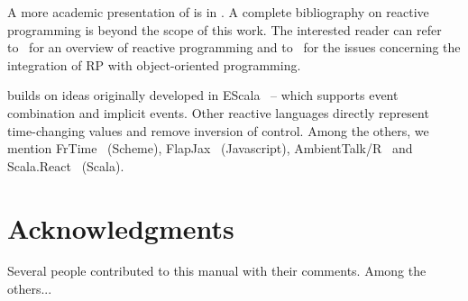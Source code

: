 \documentclass[10pt,a4paper]{article}
\newcommand{\REScala}{{\small \sc{REScala}}\xspace}
\begin{document}
A more academic presentation of \REScala is in \cite{rescala}. A
complete bibliography on reactive programming is beyond the scope of
this work. The interested reader can refer
to~\cite{rective-progr-survey} for an overview of reactive programming
and to~\cite{Salvaneschi:2013:RBO:2451436.2451442} for the issues
concerning the integration of RP with object-oriented programming.


\REScala builds on ideas originally developed in
EScala~\cite{Gasiunas:2011:EME:1960275.1960303} -- which supports
event combination and implicit events. Other reactive languages
directly represent time-changing values and remove inversion of
control. Among the others, we mention
FrTime~\cite{DBLP:conf/esop/CooperK06} (Scheme),
FlapJax~\cite{Meyerovich:2009:FPL:1640089.1640091} (Javascript),
AmbientTalk/R~\cite{ambienttalkR} and
Scala.React~\cite{EPFL-REPORT-148043} (Scala).




\newpage



\section{Acknowledgments}\label{sec:ack}

Several people contributed to this manual with their comments. Among
the others...





\newpage





\end{document}
